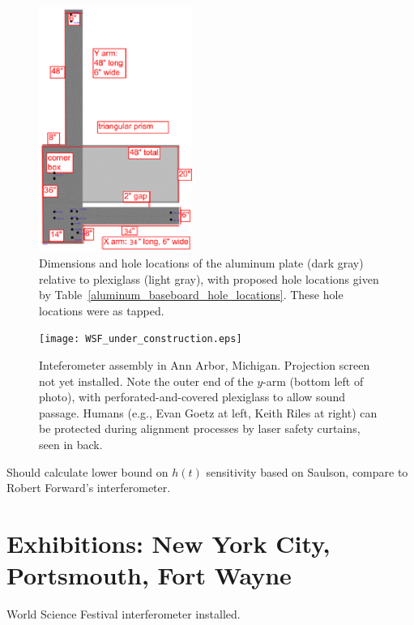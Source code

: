         \begin{figure}
        \begin{center}
        \includegraphics[height=80mm, width=50mm]{view-top-plate-3.eps}
        \caption{Dimensions and hole locations of the aluminum plate (dark gray) relative to plexiglass (light gray), with proposed hole locations given by Table~\ref{aluminum_baseboard_hole_locations}. These hole locations were as tapped.}
        \label{al_top_plate}
        \end{center}
        \end{figure}


	\begin{figure}
	\begin{center}
	\texttt{[image: WSF\_under\_construction.eps]}
	\caption{Inteferometer assembly in Ann Arbor, Michigan. Projection screen not yet installed. Note the outer end of the $y$-arm (bottom left of photo), with perforated-and-covered plexiglass to allow sound passage. Humans (e.g., Evan Goetz at left, Keith Riles at right) can be protected during alignment processes by laser safety curtains, seen in back.}
	\label{WSF_in_AA}
	\end{center}
	\end{figure}

Should calculate lower bound on $h(t)$ sensitivity based on Saulson, compare to Robert Forward's interferometer.


    \section{Exhibitions: New York City, Portsmouth, Fort Wayne}
    \label{exhibitions}

        World Science Festival interferometer installed.

